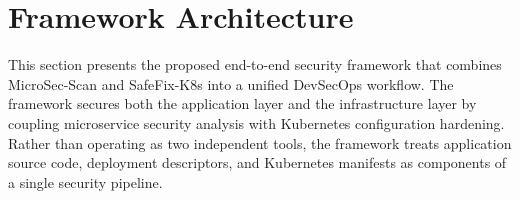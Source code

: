 \documentclass[preprint,12pt]{elsarticle}
\newcommand{\new}[1]{#1}
\begin{document}

    \new{\section{Framework Architecture}}



\new{This section presents the proposed end-to-end security framework that combines
MicroSec-Scan and SafeFix-K8s into a unified DevSecOps workflow. The framework
secures both the application layer and the infrastructure layer by coupling
microservice security analysis with Kubernetes configuration hardening.
Rather than operating as two independent tools, the framework treats
application source code, deployment descriptors, and Kubernetes manifests
as components of a single security pipeline.}
\end{document}
